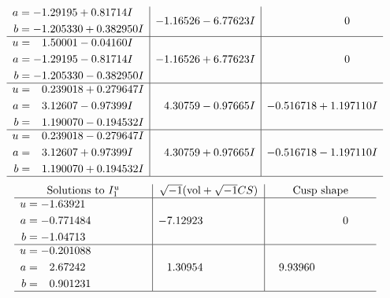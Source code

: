 \documentclass[1p]{elsarticle_modified}
\theoremstyle{definition}
\newcommand{\I}{\sqrt{-1}}
\begin{document}
$$\begin{array}{c|c|c}
\begin{aligned}
a &= -1.29195 + 0.81714 I \\
b &= -1.205330 + 0.382950 I\end{aligned}
 & -1.16526 - 6.77623 I & \phantom{-0.000000 } 0 \\ \hline\begin{aligned}
u &= \phantom{-}1.50001 - 0.04160 I \\
a &= -1.29195 - 0.81714 I \\
b &= -1.205330 - 0.382950 I\end{aligned}
 & -1.16526 + 6.77623 I & \phantom{-0.000000 } 0 \\ \hline\begin{aligned}
u &= \phantom{-}0.239018 + 0.279647 I \\
a &= \phantom{-}3.12607 - 0.97399 I \\
b &= \phantom{-}1.190070 - 0.194532 I\end{aligned}
 & \phantom{-}4.30759 - 0.97665 I & -0.516718 + 1.197110 I \\ \hline\begin{aligned}
u &= \phantom{-}0.239018 - 0.279647 I \\
a &= \phantom{-}3.12607 + 0.97399 I \\
b &= \phantom{-}1.190070 + 0.194532 I\end{aligned}
 & \phantom{-}4.30759 + 0.97665 I & -0.516718 - 1.197110 I\\
 \hline 
 \end{array}$$\newpage$$\begin{array}{c|c|c}  
\text{Solutions to }I^u_{1}& \I (\text{vol} + \sqrt{-1}CS) & \text{Cusp shape}\\
 \hline 
\begin{aligned}
u &= -1.63921\phantom{ +0.000000I} \\
a &= -0.771484\phantom{ +0.000000I} \\
b &= -1.04713\phantom{ +0.000000I}\end{aligned}
 & -7.12923\phantom{ +0.000000I} & \phantom{-0.000000 } 0 \\ \hline\begin{aligned}
u &= -0.201088\phantom{ +0.000000I} \\
a &= \phantom{-}2.67242\phantom{ +0.000000I} \\
b &= \phantom{-}0.901231\phantom{ +0.000000I}\end{aligned}
 & \phantom{-}1.30954\phantom{ +0.000000I} & \phantom{-}9.93960\phantom{ +0.000000I}\\
 \hline 
 \end{array}$$\newpage\newpage\renewcommand{\arraystretch}{1}
\end{document}
